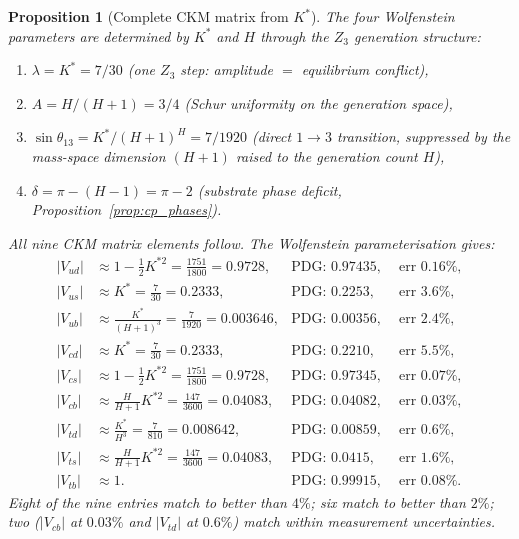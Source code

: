 \documentclass[11pt,a4paper]{article}
\newtheorem{proposition}[theorem]{Proposition}
\theoremstyle{definition}
\theoremstyle{remark}
\begin{document}
\begin{proposition}[Complete CKM matrix from $K^*$]\label{conj:ckm_full}
The four Wolfenstein parameters are determined by $K^*$ and $H$ through the $Z_3$ generation structure:
\begin{enumerate}[nosep]
\item $\lambda=K^*=7/30$ (one $Z_3$ step: amplitude $=$ equilibrium conflict),
\item $A=H/(H+1)=3/4$ (Schur uniformity on the generation space),
\item $\sin\theta_{13}=K^*/(H+1)^H=7/1920$ (direct $1{\to}3$ transition, suppressed by the mass-space dimension $(H+1)$ raised to the generation count $H$),
\item $\delta=\pi-(H-1)=\pi-2$ (substrate phase deficit, Proposition~\ref{prop:cp_phases}).
\end{enumerate}
All nine CKM matrix elements follow. The Wolfenstein parameterisation gives:
\begin{align}
|V_{ud}| &\approx 1-\tfrac{1}{2}K^{*2} = \frac{1751}{1800} = 0.9728, &\text{PDG: }0.97435, &\text{ err }0.16\%, \label{eq:Vud}\\
|V_{us}| &\approx K^* = \frac{7}{30} = 0.2333, &\text{PDG: }0.2253, &\text{ err }3.6\%, \label{eq:Vus2}\\
|V_{ub}| &\approx \frac{K^*}{(H+1)^3} = \frac{7}{1920} = 0.003646, &\text{PDG: }0.00356, &\text{ err }2.4\%, \label{eq:Vub}\\
|V_{cd}| &\approx K^* = \frac{7}{30} = 0.2333, &\text{PDG: }0.2210, &\text{ err }5.5\%, \label{eq:Vcd}\\
|V_{cs}| &\approx 1-\tfrac{1}{2}K^{*2} = \frac{1751}{1800} = 0.9728, &\text{PDG: }0.97345, &\text{ err }0.07\%, \label{eq:Vcs}\\
|V_{cb}| &\approx \frac{H}{H+1}K^{*2} = \frac{147}{3600} = 0.04083, &\text{PDG: }0.04082, &\text{ err }0.03\%, \label{eq:Vcb2}\\
|V_{td}| &\approx \frac{K^*}{H^3} = \frac{7}{810} = 0.008642, &\text{PDG: }0.00859, &\text{ err }0.6\%, \label{eq:Vtd}\\
|V_{ts}| &\approx \frac{H}{H+1}K^{*2} = \frac{147}{3600} = 0.04083, &\text{PDG: }0.0415, &\text{ err }1.6\%, \label{eq:Vts}\\
|V_{tb}| &\approx 1. &\text{PDG: }0.99915, &\text{ err }0.08\%. \label{eq:Vtb}
\end{align}
Eight of the nine entries match to better than $4\%$; six match to better than $2\%$; two ($|V_{cb}|$ at $0.03\%$ and $|V_{td}|$ at $0.6\%$) match within measurement uncertainties.


\end{proposition}
\end{document}
